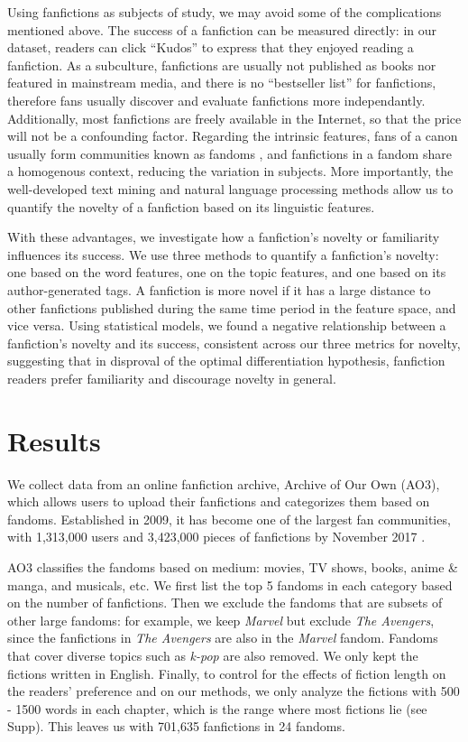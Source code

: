 \documentclass[a4paper]{article}
\begin{document}
Using fanfictions as subjects of study, we may avoid some of the complications mentioned above. The success of a fanfiction can be measured directly: in our dataset, readers can click ``Kudos'' to express that they enjoyed reading a fanfiction. As a subculture, fanfictions are usually not published as books nor featured in mainstream media, and there is no ``bestseller list'' for fanfictions, therefore fans usually discover and evaluate fanfictions more independantly. Additionally, most fanfictions are freely available in the Internet, so that the price will not be a confounding factor. Regarding the intrinsic features, fans of a canon usually form communities known as fandoms \cite{wiki:fandom}, and fanfictions in a fandom share a homogenous context, reducing the variation in subjects. More importantly, the well-developed text mining and natural language processing methods allow us to quantify the novelty of a fanfiction based on its linguistic features.

With these advantages, we investigate how a fanfiction's novelty or familiarity influences its success. We use three methods to quantify a fanfiction's novelty: one based on the word features, one on the topic features, and one based on its author-generated tags. A fanfiction is more novel if it has a large distance to other fanfictions published during the same time period in the feature space, and vice versa. Using statistical models, we found a negative relationship between a fanfiction's novelty and its success, consistent across our three metrics for novelty, suggesting that in disproval of the optimal differentiation hypothesis, fanfiction readers prefer familiarity and discourage novelty in general.


\section*{Results} 
We collect data from an online fanfiction archive, Archive of Our Own (AO3), which allows users to upload their fanfictions and categorizes them based on fandoms. Established in 2009, it has become one of the largest fan communities, with 1,313,000 users and 3,423,000 pieces of fanfictions by November 2017 \cite{ao3stats}.

AO3 classifies the fandoms based on medium: movies, TV shows, books, anime \& manga, and musicals, etc. We first list the top 5 fandoms in each category based on the number of fanfictions. Then we exclude the fandoms that are subsets of other large fandoms: for example, we keep \emph{Marvel} but exclude \emph{The Avengers}, since the fanfictions in \emph{The Avengers} are also in the \emph{Marvel} fandom. Fandoms that cover diverse topics such as \emph{k-pop} are also removed. We only kept the fictions written in English. Finally, to control for the effects of fiction length on the readers' preference and on our methods, we only analyze the fictions with 500 - 1500 words in each chapter, which is the range where most fictions lie (see Supp). This leaves us with 701,635 fanfictions in 24 fandoms.
\end{document}
